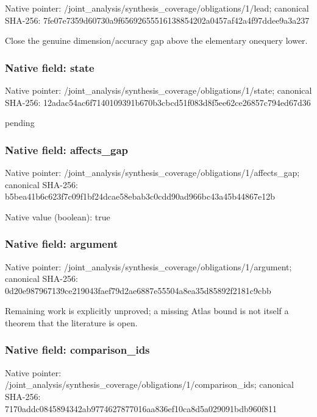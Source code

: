 \documentclass[10pt,a4paper]{article}
\begin{document}
Native pointer: /joint\_analysis/synthesi\allowbreak{}s\_coverage/obligations/1\allowbreak{}/lead; canonical SHA-256: 7fe07e7359d60730a9f65692\allowbreak{}655516138854202a0457af42\allowbreak{}a4f97ddee9a3a237


Close the genuine dimension/accuracy gap above the elementary onequery lower.


\subsubsection{Native field: state}


Native pointer: /joint\_analysis/synthesi\allowbreak{}s\_coverage/obligations/1\allowbreak{}/state; canonical SHA-256: 12adac54ac6f7140109391b6\allowbreak{}70b3cbcd51f083d8f5ee62ce\allowbreak{}26857c794ed67d36


pending


\subsubsection{Native field: affects\_gap}


Native pointer: /joint\_analysis/synthesi\allowbreak{}s\_coverage/obligations/1\allowbreak{}/affects\_gap; canonical SHA-256: b5bea41b6c623f7c09f1bf24\allowbreak{}dcae58ebab3c0cdd90ad966b\allowbreak{}c43a45b44867e12b



Native value (boolean): true



\subsubsection{Native field: argument}


Native pointer: /joint\_analysis/synthesi\allowbreak{}s\_coverage/obligations/1\allowbreak{}/argument; canonical SHA-256: 0d20e987967139ce219043fa\allowbreak{}ef79d2ae6887e55504a8ea35\allowbreak{}d85892f2181c9cbb


Remaining work is explicitly unproved; a missing Atlas bound is not itself a theorem that the literature is open.


\subsubsection{Native field: comparison\_ids}


Native pointer: /joint\_analysis/synthesi\allowbreak{}s\_coverage/obligations/1\allowbreak{}/comparison\_ids; canonical SHA-256: 7170addc0845894342ab9774\allowbreak{}627877016aa836ef10ca8d5a\allowbreak{}029091bdb960f811
\end{document}

